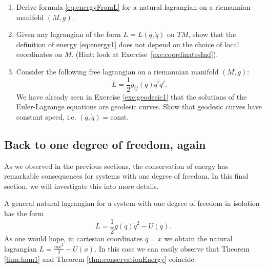 \documentclass[english,fontsize=11pt,paper=a5,oneside]{scrbook}
\let\d\relax
\DeclareMathOperator{\d}{d}
\theoremstyle{definition}
\newenvironment{exercise}
  {\pushQED{\qed}\renewcommand{\qedsymbol}{$\maltese$}\exercisex}
  {\popQED\endexercisex}
\begin{document}
\begin{exercise}
    \begin{enumerate}
        \item Derive formula \eqref{eq:energyFromL} for a natural lagrangian on a riemannian manifold $(M,g)$.
        \item Given any lagrangian of the form $L = L(q, \dot q)$ on $TM$, show that the definition of energy \eqref{eq:energy1} does not depend on the choice of local coordinates on $M$. (Hint: look at Exercise~\ref{exe:coordinatesInd}).
        \item Consider the following free lagrangian on a riemannian manifold $(M, g)$:
        \begin{equation}
            L = \frac12 g_{ij}(q)\dot q^i \dot q^j.
        \end{equation}
        We have already seen in Exercise \ref{exe:geodesic1} that the solutions of the Euler-Lagrange equations are geodesic curves.
        Show that geodesic curves have constant speed, i.e. $(\dot q, \dot q) = \mathrm{const}$.
    \end{enumerate}
\end{exercise}




\subsection{Back to one degree of freedom, again}\label{sec:1deg-again}

As we observed in the previous sections, the conservation of energy has remarkable consequences for systems with one degree of freedom.
In this final section, we will investigate this into more details.

A general natural lagrangian for a system with one degree of freedom in isolation has the form
\begin{equation}
    L = \frac12 g(q)\dot q^2 - U(q).
\end{equation}
As one would hope, in cartesian coordinates $q = x$ we obtain the natural lagrangian $L = \frac{m \dot x^2}{2} - U(x)$.
In this case we can easily observe that Theorem \ref{thm:ham1} and Theorem \ref{thm:conservationEnergy} coincide.
\end{document}
